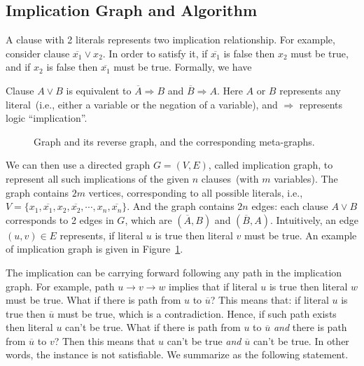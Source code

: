 \subsection*{Implication Graph and Algorithm}

A clause with 2 literals represents two implication relationship.
For example, consider clause $\overline{x_1} \vee x_2$.
In order to satisfy it, if $\overline{x_1}$ is false then $x_2$ must be true, and  
if $x_2$ is false then $\overline{x_1}$ must be true.  
Formally, we have

\begin{fact}
Clause $A\vee B$ is equivalent to $\overline{A} \Rightarrow B$ and $\overline{B} \Rightarrow A$.
Here $A$ or $B$ represents any literal~(i.e., either a variable or the negation of a variable),
and $\Rightarrow$ represents logic ``implication''.
\end{fact}

\begin{figure}[b!]
\centering{}
\caption{Graph and its reverse graph, and the corresponding meta-graphs.}
\label{fig:instance1}
\end{figure}

We can then use a directed graph $G = (V,E)$, called implication graph, to represent all such implications of the given $n$ clauses~(with $m$ variables).
The graph contains $2m$ vertices, corresponding to all possible literals, i.e.,
$V = \{x_1, \overline{x_1}, x_2, \overline{x_2}, \cdots, x_n, \overline{x_n}\}$.
And the graph contains $2n$ edges: each clause $A\vee B$ corresponds to 2 edges in $G$, which are $(\overline{A}, B)$ and $(\overline{B}, A)$.
Intuitively, an edge $(u,v)\in E$ represents, if literal $u$ is true then literal $v$ must be true.
An example of implication graph is given in Figure~\ref{fig:instance1}.


The implication can be carrying forward following any path in the implication graph. For example, path
$u\to v \to w$ implies that if literal $u$ is true then literal $w$ must be
true. What if there is path from $u$ to $\overline{u}$?
This means that: if literal $u$ is true then $\overline{u}$ must be true, which is a contradiction.
Hence, if such path exists then literal $u$ can't be true.
What if there is path from $u$ to $\overline{u}$ \emph{and}
there is path from $\overline{u}$ to $v$?
Then this means that $u$ can't be true \emph{and} $\overline{u}$ can't be true.
In other words, the instance is not satisfiable.
We summarize as the following statement. 

